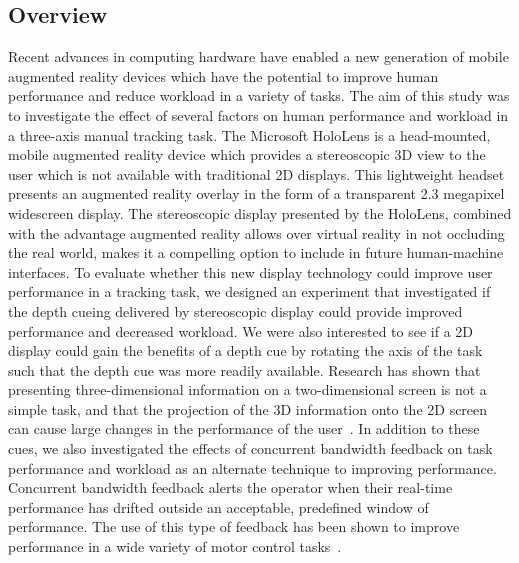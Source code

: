 \subsection{Overview}
Recent advances in computing hardware have enabled a new generation of mobile augmented reality devices which have the potential to improve human performance and reduce workload in a variety of tasks.
The aim of this study was to investigate the effect of several factors on human performance and workload in a three-axis manual tracking task.
The Microsoft HoloLens is a head-mounted, mobile augmented reality device which provides a stereoscopic 3D view to the user which is not available with traditional 2D displays.
This lightweight headset presents an augmented reality overlay in the form of a transparent 2.3 megapixel widescreen display.
The stereoscopic display presented by the HoloLens, combined with the advantage augmented reality allows over virtual reality in not occluding the real world, makes it a compelling option to include in future human-machine interfaces.
To evaluate whether this new display technology could improve user performance in a tracking task, we designed an experiment that investigated if the depth cueing delivered by stereoscopic display could provide improved performance and decreased workload.
We were also interested to see if a 2D display could gain the benefits of a depth cue by rotating the axis of the task such that the depth cue was more readily available.
Research has shown that presenting three-dimensional information on a two-dimensional screen is not a simple task, and that the projection of the 3D information onto the 2D screen can cause large changes in the performance of the user~\citep{kim_quantitative_1987}.
In addition to these cues, we also investigated the effects of concurrent bandwidth feedback on task performance and workload as an alternate technique to improving performance.
Concurrent bandwidth feedback alerts the operator when their real-time performance has drifted outside an acceptable, predefined window of performance.
The use of this type of feedback has been shown to improve performance in a wide variety of motor control tasks~\citep{salmoni_knowledge_1984,sigrist_augmented_2013,karasinski_real-time_2017}.

